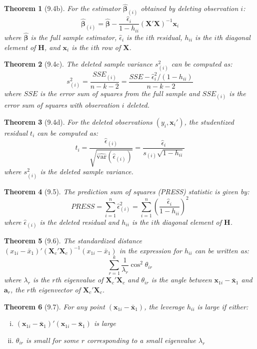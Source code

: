 \documentclass{article}
\newtheorem{theorem}{Theorem}[section]
\begin{document}
\begin{theorem}[9.4b]
For the estimator $\hat{\boldsymbol{\beta}}_{(i)}$ obtained by deleting observation $i$:
\[\hat{\boldsymbol{\beta}}_{(i)} = \hat{\boldsymbol{\beta}} - \frac{\hat{\epsilon}_i}{1-h_{ii}}(\mathbf{X}'\mathbf{X})^{-1}\mathbf{x}_i\]
where $\hat{\boldsymbol{\beta}}$ is the full sample estimator, $\hat{\epsilon}_i$ is the $i$th residual, $h_{ii}$ is the $i$th diagonal element of $\mathbf{H}$, and $\mathbf{x}_i$ is the $i$th row of $\mathbf{X}$.
\end{theorem}

\begin{theorem}[9.4c]
The deleted sample variance $s^2_{(i)}$ can be computed as:
\[s^2_{(i)} = \frac{SSE_{(i)}}{n-k-2} = \frac{SSE - \hat{\epsilon}_i^2/(1-h_{ii})}{n-k-2}\]
where $SSE$ is the error sum of squares from the full sample and $SSE_{(i)}$ is the error sum of squares with observation $i$ deleted.
\end{theorem}

\begin{theorem}[9.4d]
For the deleted observations $(y_i, \mathbf{x}_i')$, the studentized residual $t_i$ can be computed as:
\[t_i = \frac{\hat{\epsilon}_{(i)}}{\sqrt{\widehat{\text{var}}(\hat{\epsilon}_{(i)})}} = \frac{\hat{\epsilon}_i}{s_{(i)}\sqrt{1-h_{ii}}}\]
where $s_{(i)}^2$ is the deleted sample variance.
\end{theorem}

\begin{theorem}[9.5]
The prediction sum of squares (PRESS) statistic is given by:
\[PRESS = \sum_{i=1}^n \hat{\epsilon}_{(i)}^2 = \sum_{i=1}^n \left(\frac{\hat{\epsilon}_i}{1-h_{ii}}\right)^2\]
where $\hat{\epsilon}_{(i)}$ is the deleted residual and $h_{ii}$ is the $i$th diagonal element of $\mathbf{H}$.
\end{theorem}

\begin{theorem}[9.6]
The standardized distance $(x_{1i} - \bar{x}_1)'(\mathbf{X}_c'\mathbf{X}_c)^{-1}(x_{1i} - \bar{x}_1)$ in the expression for $h_{ii}$ can be written as:
\[\sum_{r=1}^k \frac{1}{\lambda_r}\cos^2\theta_{ir}\]
where $\lambda_r$ is the $r$th eigenvalue of $\mathbf{X}_c'\mathbf{X}_c$ and $\theta_{ir}$ is the angle between $\mathbf{x}_{1i} - \bar{\mathbf{x}}_1$ and $\mathbf{a}_r$, the $r$th eigenvector of $\mathbf{X}_c'\mathbf{X}_c$.
\end{theorem}

\begin{theorem}[9.7]
For any point $(\mathbf{x}_{1i} - \bar{\mathbf{x}}_1)$, the leverage $h_{ii}$ is large if either:
\begin{enumerate}[(i)]
\item $(\mathbf{x}_{1i} - \bar{\mathbf{x}}_1)'(\mathbf{x}_{1i} - \bar{\mathbf{x}}_1)$ is large
\item $\theta_{ir}$ is small for some $r$ corresponding to a small eigenvalue $\lambda_r$
\end{enumerate}
\end{theorem}
\end{document}
